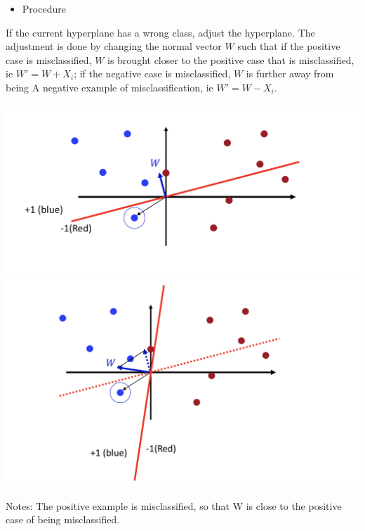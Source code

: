 \documentclass{article}
\begin{document}
	\begin{itemize}
		\item Procedure
	\end{itemize}
	
	If the current hyperplane has a wrong class, adjust the hyperplane. The adjustment is done by changing the normal vector $W$ such that if the positive case is misclassified, $W$ is brought closer to the positive case that is misclassified, ie $W'=W+X_i$; if the negative case is misclassified, $W$ is further away from being A negative example of misclassification, ie $W'=W-X_i$.
	
	\includegraphics[scale=0.2]{46.png}
	\includegraphics[scale=0.2]{47.png}
	
	Notes: The positive example is misclassified, so that W is close to the positive case of being misclassified.
	
\end{document}
